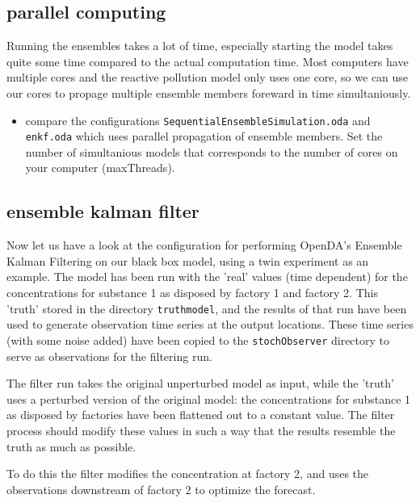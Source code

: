 \subsection{parallel computing}
Running the ensembles takes a lot of time, especially starting the model takes quite some time compared to the actual computation time. Most computers have multiple cores and the reactive pollution model only uses one core, so we can use our cores to propage multiple ensemble members foreward in time simultaniously. 
\begin{itemize}
	\item compare the configurations {\tt SequentialEnsembleSimulation.oda} and\\
		{\tt enkf.oda} which uses parallel propagation of ensemble members. Set the number of simultanious models that corresponds to the number of cores on your computer (maxThreads).
\end{itemize}

\subsection{ensemble kalman filter}


Now let us have a look at the configuration for performing OpenDA's Ensemble
Kalman Filtering on our black box model, using a twin experiment as an example.
The model has been run with the 'real' values (time dependent) for the
concentrations for substance 1 as disposed by factory 1 and factory 2. This
'truth' stored in the directory {\tt truthmodel}, and the results of that run
have been used to generate observation time series at the output locations.
These time series (with some noise added) have been copied to the {\tt stochObserver} directory to
serve as observations for the filtering run.

The filter run takes the original unperturbed model as input, while the 'truth' 
uses a perturbed version of the original model: the concentrations for substance 1 as disposed by
factories have been flattened out to a constant value. The filter process
should modify these values in such a way that the results resemble the truth as
much as possible.

To do this the filter modifies the concentration at factory 2, and uses the
observations downstream of factory 2 to optimize the forecast.

